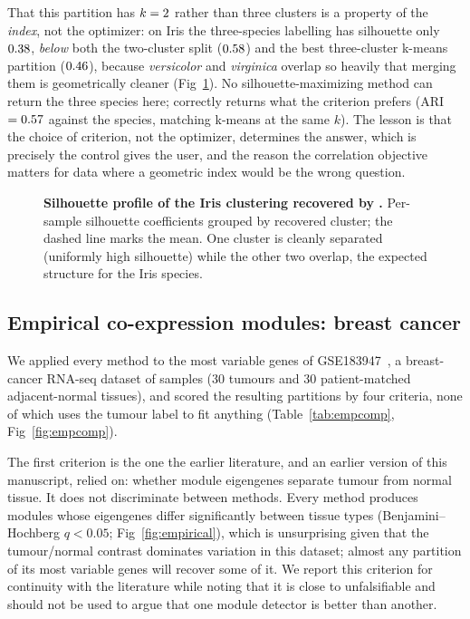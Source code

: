 That this partition has $k=2{}$ rather than three clusters is a property
of the \emph{index}, not the optimizer: on Iris the three-species labelling has
silhouette only $0.38{}$, \emph{below} both the two-cluster split
($0.58{}$) and the best three-cluster k-means partition
($0.46{}$), because \emph{versicolor} and \emph{virginica} overlap so
heavily that merging them is geometrically cleaner (Fig~\ref{fig:iris}). No
silhouette-maximizing method can return the three species here; \tool{} correctly
returns what the criterion prefers (ARI $=0.57{}$ against the species,
matching k-means at the same $k$). The lesson is that the choice of criterion,
not the optimizer, determines the answer, which is precisely the control \tool{}
gives the user, and the reason the correlation objective matters for data where a
geometric index would be the wrong question.

\begin{figure}[!h]
\caption{\textbf{Silhouette profile of the Iris clustering recovered by \tool{}.}
Per-sample silhouette coefficients grouped by recovered cluster; the dashed line
marks the mean. One cluster is cleanly separated (uniformly high silhouette)
while the other two overlap, the expected structure for the Iris species.}
\label{fig:iris}
\end{figure}

\subsection*{Empirical co-expression modules: breast cancer}
We applied every method to the \EmpCompNTop{} most variable genes of
GSE183947~\cite{Zhang2021}, a breast-cancer RNA-seq dataset of \EmpSamples{}
samples (30 tumours and 30 patient-matched adjacent-normal tissues), and scored
the resulting partitions by four criteria, none of which uses the tumour label to
fit anything (Table~\ref{tab:empcomp}, Fig~\ref{fig:empcomp}).

The first criterion is the one the earlier literature, and an earlier version of
this manuscript, relied on: whether module eigengenes separate tumour from normal
tissue. It does not discriminate between methods. Every method produces modules
whose eigengenes differ significantly between tissue types
(Benjamini--Hochberg $q<0.05$; Fig~\ref{fig:empirical}), which is unsurprising given that the
tumour/normal contrast dominates variation in this dataset; almost any partition
of its most variable genes will recover some of it. We report this criterion for
continuity with the literature while noting that it is close to unfalsifiable and
should not be used to argue that one module detector is better than another.

